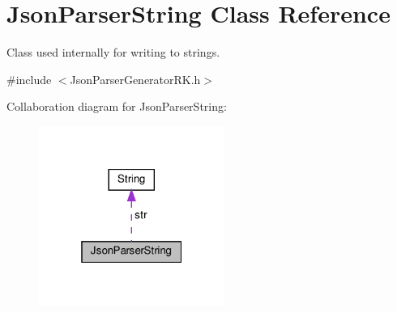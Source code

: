 \hypertarget{class_json_parser_string}{}\section{Json\+Parser\+String Class Reference}
\label{class_json_parser_string}


Class used internally for writing to strings.  




{\ttfamily \#include $<$Json\+Parser\+Generator\+R\+K.\+h$>$}



Collaboration diagram for Json\+Parser\+String\+:
\nopagebreak
\begin{figure}[H]
\begin{center}
\leavevmode
\includegraphics[width=172pt]{class_json_parser_string__coll__graph}
\end{center}
\end{figure}
